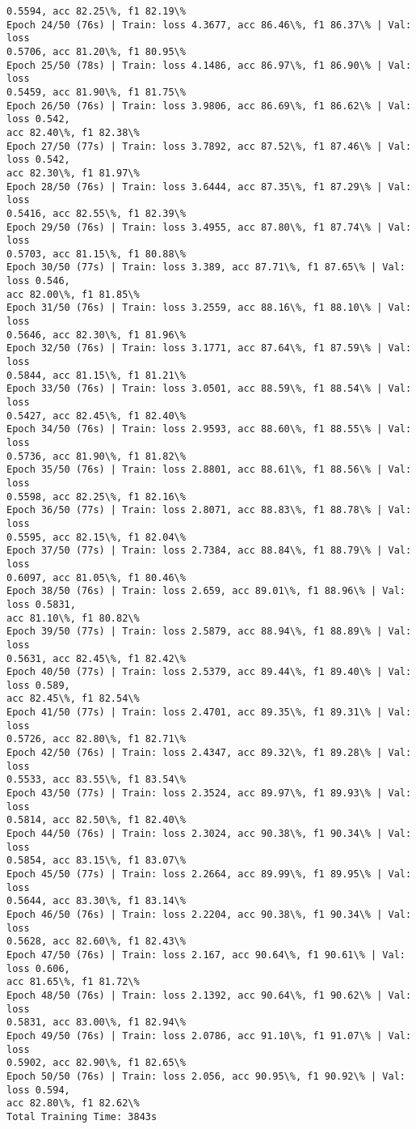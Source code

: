 \documentclass[8pt]{extarticle}
\begin{document}
\begin{Verbatim}[commandchars=\\\{\}]
0.5594, acc 82.25\%, f1 82.19\%
Epoch 24/50 (76s) | Train: loss 4.3677, acc 86.46\%, f1 86.37\% | Val: loss
0.5706, acc 81.20\%, f1 80.95\%
Epoch 25/50 (78s) | Train: loss 4.1486, acc 86.97\%, f1 86.90\% | Val: loss
0.5459, acc 81.90\%, f1 81.75\%
Epoch 26/50 (76s) | Train: loss 3.9806, acc 86.69\%, f1 86.62\% | Val: loss 0.542,
acc 82.40\%, f1 82.38\%
Epoch 27/50 (77s) | Train: loss 3.7892, acc 87.52\%, f1 87.46\% | Val: loss 0.542,
acc 82.30\%, f1 81.97\%
Epoch 28/50 (76s) | Train: loss 3.6444, acc 87.35\%, f1 87.29\% | Val: loss
0.5416, acc 82.55\%, f1 82.39\%
Epoch 29/50 (76s) | Train: loss 3.4955, acc 87.80\%, f1 87.74\% | Val: loss
0.5703, acc 81.15\%, f1 80.88\%
Epoch 30/50 (77s) | Train: loss 3.389, acc 87.71\%, f1 87.65\% | Val: loss 0.546,
acc 82.00\%, f1 81.85\%
Epoch 31/50 (76s) | Train: loss 3.2559, acc 88.16\%, f1 88.10\% | Val: loss
0.5646, acc 82.30\%, f1 81.96\%
Epoch 32/50 (76s) | Train: loss 3.1771, acc 87.64\%, f1 87.59\% | Val: loss
0.5844, acc 81.15\%, f1 81.21\%
Epoch 33/50 (76s) | Train: loss 3.0501, acc 88.59\%, f1 88.54\% | Val: loss
0.5427, acc 82.45\%, f1 82.40\%
Epoch 34/50 (76s) | Train: loss 2.9593, acc 88.60\%, f1 88.55\% | Val: loss
0.5736, acc 81.90\%, f1 81.82\%
Epoch 35/50 (76s) | Train: loss 2.8801, acc 88.61\%, f1 88.56\% | Val: loss
0.5598, acc 82.25\%, f1 82.16\%
Epoch 36/50 (77s) | Train: loss 2.8071, acc 88.83\%, f1 88.78\% | Val: loss
0.5595, acc 82.15\%, f1 82.04\%
Epoch 37/50 (77s) | Train: loss 2.7384, acc 88.84\%, f1 88.79\% | Val: loss
0.6097, acc 81.05\%, f1 80.46\%
Epoch 38/50 (76s) | Train: loss 2.659, acc 89.01\%, f1 88.96\% | Val: loss 0.5831,
acc 81.10\%, f1 80.82\%
Epoch 39/50 (77s) | Train: loss 2.5879, acc 88.94\%, f1 88.89\% | Val: loss
0.5631, acc 82.45\%, f1 82.42\%
Epoch 40/50 (77s) | Train: loss 2.5379, acc 89.44\%, f1 89.40\% | Val: loss 0.589,
acc 82.45\%, f1 82.54\%
Epoch 41/50 (77s) | Train: loss 2.4701, acc 89.35\%, f1 89.31\% | Val: loss
0.5726, acc 82.80\%, f1 82.71\%
Epoch 42/50 (76s) | Train: loss 2.4347, acc 89.32\%, f1 89.28\% | Val: loss
0.5533, acc 83.55\%, f1 83.54\%
Epoch 43/50 (77s) | Train: loss 2.3524, acc 89.97\%, f1 89.93\% | Val: loss
0.5814, acc 82.50\%, f1 82.40\%
Epoch 44/50 (76s) | Train: loss 2.3024, acc 90.38\%, f1 90.34\% | Val: loss
0.5854, acc 83.15\%, f1 83.07\%
Epoch 45/50 (77s) | Train: loss 2.2664, acc 89.99\%, f1 89.95\% | Val: loss
0.5644, acc 83.30\%, f1 83.14\%
Epoch 46/50 (76s) | Train: loss 2.2204, acc 90.38\%, f1 90.34\% | Val: loss
0.5628, acc 82.60\%, f1 82.43\%
Epoch 47/50 (76s) | Train: loss 2.167, acc 90.64\%, f1 90.61\% | Val: loss 0.606,
acc 81.65\%, f1 81.72\%
Epoch 48/50 (76s) | Train: loss 2.1392, acc 90.64\%, f1 90.62\% | Val: loss
0.5831, acc 83.00\%, f1 82.94\%
Epoch 49/50 (76s) | Train: loss 2.0786, acc 91.10\%, f1 91.07\% | Val: loss
0.5902, acc 82.90\%, f1 82.65\%
Epoch 50/50 (76s) | Train: loss 2.056, acc 90.95\%, f1 90.92\% | Val: loss 0.594,
acc 82.80\%, f1 82.62\%
Total Training Time: 3843s


\end{Verbatim}
\end{document}

